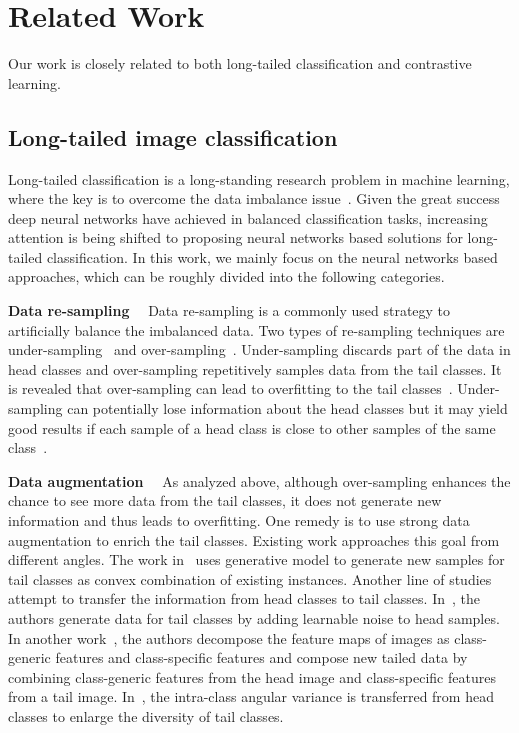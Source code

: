 \documentclass[final]{cvpr}
\begin{document}
\section{Related Work}
Our work is closely related to both long-tailed classification and contrastive learning.

\subsection{Long-tailed image classification}

Long-tailed classification is a long-standing research problem in machine learning, where the key is to overcome the data imbalance issue~\cite{Kubat97addressingthe,nips99}. Given the great success deep neural networks have achieved in balanced classification tasks, increasing attention is being shifted to proposing neural networks based solutions for long-tailed classification. In this work, we mainly focus on the neural networks based approaches, which can be roughly divided into the following categories.



\par{\textbf{Data re-sampling}}~~
Data re-sampling is a commonly used strategy to artificially balance the imbalanced data. Two types of re-sampling techniques are under-sampling~\cite{imbalance1,more2016survey, imbalance2} and over-sampling~\cite{imbalance1, oversampling_relay, Sarafianos_2018_ECCV}. Under-sampling discards part of the data in head classes and over-sampling repetitively samples data from the tail classes. It is revealed that over-sampling can lead to overfitting to the tail classes~\cite{SMOTE, more2016survey}. Under-sampling can potentially lose information about the head classes but it may yield good results if each sample of a head class is close to other samples of the same class~\cite{more2016survey}. 

\par{\textbf{Data augmentation}}~~
As analyzed above, although over-sampling enhances the chance to see more data from the tail classes, it does not generate new information and thus leads to overfitting. One remedy is to use strong data augmentation to enrich the tail classes. Existing work approaches this goal from different angles. The work in~\cite{GAMO} uses generative model to generate new samples for tail classes as convex combination of existing instances. Another line of studies attempt to transfer the information from head classes to tail classes. In~\cite{m2m}, the authors generate data for tail classes by adding learnable noise to head samples. In another work~\cite{feataug}, the authors decompose the feature maps of images as class-generic features and class-specific features and compose new tailed data by combining class-generic features from the head image and class-specific features from a tail image. In~\cite{angular}, the intra-class angular variance is transferred from head classes to enlarge the diversity of tail classes.  
\end{document}

